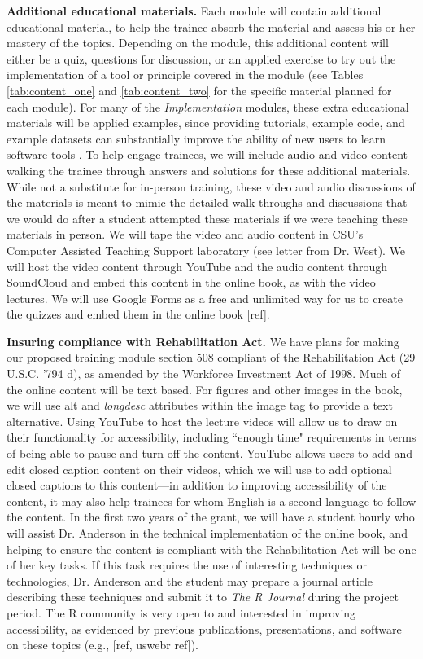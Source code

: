 \documentclass[pdftex,english,11pt,parskip=half]{scrartcl}
\begin{document}
\textbf{Additional educational materials.} Each module will contain additional
educational material, to help the trainee absorb the material and assess his or
her mastery of the topics. Depending on the module, this additional content will
either be a quiz, questions for discussion, or an applied exercise to try out
the implementation of a tool or principle covered in the module (see Tables
\ref{tab:content_one} and \ref{tab:content_two} for the specific material
planned for each module). For many of the \textit{Implementation} modules, these extra educational materials will be applied examples, since providing tutorials, example code, and example datasets can substantially improve the ability of new users to learn software tools \cite{list2017ten}. To help engage trainees, we will include audio and
video content walking the trainee through answers and solutions for these
additional materials. While not a substitute for in-person training, these video
and audio discussions of the materials is meant to mimic the detailed
walk-throughs and discussions that we would do after a student attempted these
materials if we were teaching these materials in person. We will tape the video
and audio content in CSU's Computer Assisted Teaching Support laboratory (see
letter from Dr. West). We will host the video content through YouTube and the
audio content through SoundCloud and embed this content in the online book, as
with the video lectures. We will use Google Forms as a free and unlimited way
for us to create the quizzes and embed them in the online book [ref].

\noindent \textbf{Insuring compliance with Rehabilitation Act.} We have plans
for making our proposed training module section 508 compliant of the
Rehabilitation Act (29 U.S.C. '794 d), as amended by the Workforce Investment
Act of 1998. Much of the online content will be text based. For figures and
other images in the book, we will use alt and \textit{longdesc} attributes
within the image tag to provide a text alternative. Using YouTube to host the
lecture videos will allow us to draw on their functionality for accessibility,
including ``enough time" requirements in terms of being able to pause and turn
off the content. YouTube allows users to add and edit closed caption content on
their videos, which we will use to add optional closed captions to this
content---in addition to improving accessibility of the content, it may also
help trainees for whom English is a second language to follow the content. In
the first two years of the grant, we will have a student hourly who will assist
Dr. Anderson in the technical implementation of the online book, and helping to
ensure the content is compliant with the Rehabilitation Act will be one of her
key tasks. If this task requires the use of interesting techniques or
technologies, Dr. Anderson and the student may prepare a journal article
describing these techniques and submit it to \textit{The R Journal} during the
project period. The R community is very open to and interested in improving
accessibility, as evidenced by previous publications, presentations, and
software on these topics (e.g., [ref, uswebr ref]).
\end{document}
